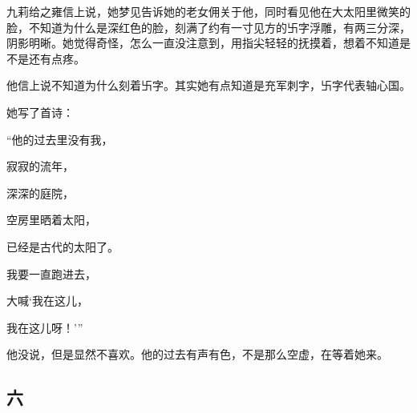\par 九莉给之雍信上说，她梦见告诉她的老女佣关于他，同时看见他在大太阳里微笑的脸，不知道为什么是深红色的脸，刻满了约有一寸见方的卐字浮雕，有两三分深，阴影明晰。她觉得奇怪，怎么一直没注意到，用指尖轻轻的抚摸着，想着不知道是不是还有点疼。
\par 他信上说不知道为什么刻着卐字。其实她有点知道是充军刺字，卐字代表轴心国。
\par 她写了首诗：
\par “他的过去里没有我，
\par 寂寂的流年，
\par 深深的庭院，
\par 空房里晒着太阳，
\par 已经是古代的太阳了。
\par 我要一直跑进去，
\par 大喊‘我在这儿，
\par 我在这儿呀！'”
\par 他没说，但是显然不喜欢。他的过去有声有色，不是那么空虚，在等着她来。








\subsection{六}

